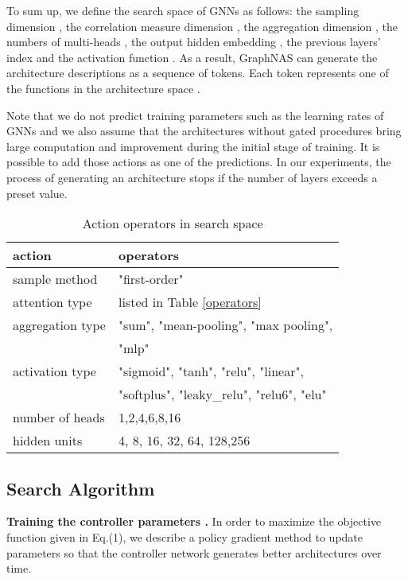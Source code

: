 \documentclass{article}
\begin{document}
To sum up, we define the search space of GNNs  as follows: the sampling dimension  , the correlation measure dimension , the aggregation dimension , the numbers of multi-heads , the output hidden embedding , the previous layers' index  and the activation function . As a result,  GraphNAS can generate the architecture descriptions as a sequence of tokens. Each token represents one of the functions in the architecture space . 

Note that we do not predict training parameters such as the learning rates of GNNs and we also assume that the architectures without gated procedures bring large computation and improvement during the initial stage of training. It is possible to add those actions as one of the predictions. In our experiments, the process of generating an architecture stops if the number of layers exceeds a preset value.

\begin{table}
	\caption{Action operators in search space}
	\label{actions}
	\begin{tabular}{l|l}
		\hline
		
		action            & operators  
        \\ \hline
        sample method & "first-order"    \\ \hline
		attention type    & listed in Table \ref{operators}      \\ \hline
		aggregation type & "sum", "mean-pooling", "max pooling", \\ & "mlp" \\  \hline
		activation type  & "sigmoid", "tanh", "relu", "linear",\\ &"softplus", "leaky\_relu", "relu6", "elu" \\ \hline
		number of heads & 1,2,4,6,8,16                                                                   \\ \hline
		hidden units     & 4, 8, 16, 32, 64, 128,256                                                         \\ \hline
	\end{tabular}
\end{table}

\subsection{Search Algorithm}
\label{Algorithms}
\textbf{Training the controller parameters .}
In order to maximize the objective function given in Eq.(1), we describe a policy gradient method to update parameters  so that the controller network generates better architectures over time.
\end{document}
